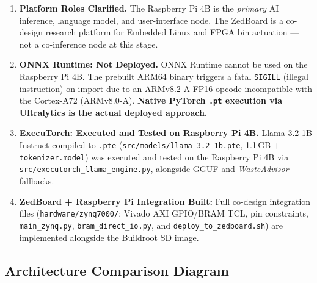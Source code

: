 \documentclass[12pt,a4paper]{article}
\begin{document}
\begin{importantbox}
\begin{enumerate}[label=\textbf{\arabic*.},itemsep=6pt]
  \item \textbf{Platform Roles Clarified.}
  The Raspberry Pi 4B is the \textit{primary} AI inference, language model, and
  user-interface node. The ZedBoard is a co-design research platform for Embedded Linux
  and FPGA bin actuation --- not a co-inference node at this stage.

  \item \textbf{ONNX Runtime: Not Deployed.}
  ONNX Runtime cannot be used on the Raspberry Pi 4B. The prebuilt ARM64 binary
  triggers a fatal \texttt{SIGILL} (illegal instruction) on import due to an
  ARMv8.2-A FP16 opcode incompatible with the Cortex-A72 (ARMv8.0-A).
  \textbf{Native PyTorch \texttt{.pt} execution via Ultralytics is the actual
  deployed approach.}

  \item \textbf{ExecuTorch: Executed and Tested on Raspberry Pi 4B.}
  Llama 3.2 1B Instruct compiled to \texttt{.pte} (\texttt{src/models/llama-3.2-1b.pte},
  1.1\,GB + \texttt{tokenizer.model}) was executed and tested on the Raspberry Pi 4B via
  \texttt{src/executorch\_llama\_engine.py}, alongside GGUF and \textit{WasteAdvisor} fallbacks.
  \item \textbf{ZedBoard + Raspberry Pi Integration Built:}
  Full co-design integration files (\texttt{hardware/zynq7000/}: Vivado AXI GPIO/BRAM TCL,
  pin constraints, \texttt{main\_zynq.py}, \texttt{bram\_direct\_io.py}, and
  \texttt{deploy\_to\_zedboard.sh}) are implemented alongside the Buildroot SD image.
\end{enumerate}
\end{importantbox}

\subsection{Architecture Comparison Diagram}
\end{document}
